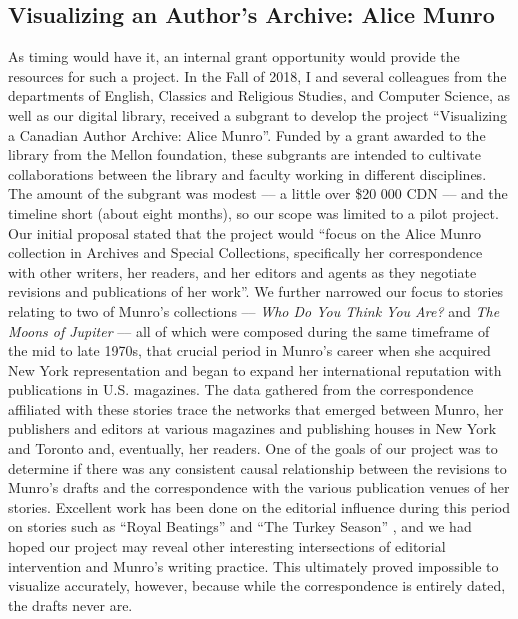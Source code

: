 \begin{paper}
\subsection*{Visualizing an Author's Archive: Alice Munro}

As timing would have it, an internal grant opportunity would provide the
resources for such a project. In the Fall of 2018, I and several colleagues
from the departments of English, Classics and Religious Studies, and
Computer Science, as well as our digital library, received a subgrant to
develop the project ``Visualizing a Canadian Author Archive: Alice
Munro''. Funded by a grant awarded to the library from the Mellon
foundation, these subgrants are intended to cultivate collaborations
between the library and faculty working in different disciplines. The
amount of the subgrant was modest –– a little over \$20 000 CDN –– and the
timeline short (about eight months), so our scope was limited to a pilot
project. Our initial proposal stated that the project would ``focus on
the Alice Munro collection in Archives and Special Collections,
specifically her correspondence with other writers, her readers, and her
editors and agents as they negotiate revisions and publications of her
work''. We further narrowed our focus to stories relating to two of
Munro's collections –– \emph{Who Do You Think You Are?} \citep{munro_who_1977} and
\emph{The Moons of Jupiter} \citep{munro_moons_1983} –– all of which were composed during
the same timeframe of the mid to late 1970s, that crucial period in
Munro's career when she acquired New York representation and began to
expand her international reputation with publications in U.S. magazines.
The data gathered from the correspondence affiliated with these stories
trace the networks that emerged between Munro, her publishers and
editors at various magazines and publishing houses in New York and
Toronto and, eventually, her readers. One of the goals of our project
was to determine if there was any consistent causal relationship between
the revisions to Munro's drafts and the correspondence with the various
publication venues of her stories. Excellent work has been done on the
editorial influence during this period on stories such as ``Royal
Beatings'' \citep{beran_luxury_1998} and ``The Turkey Season'' \citep{fladd_alice_2015}, and we had hoped
our project may reveal other interesting intersections of editorial
intervention and Munro's writing practice. This ultimately proved impossible to visualize accurately, however, because while the correspondence is entirely dated, the drafts never are.


\end{paper}
